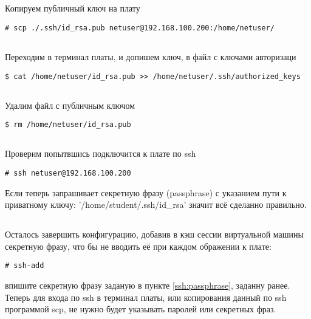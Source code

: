 \subsection{}Копируем публичный ключ на плату
\begin{lstlisting}[style=bash]
# scp ./.ssh/id_rsa.pub netuser@192.168.100.200:/home/netuser/
\end{lstlisting}

\subsection{}Переходим в терминал платы, и допишем ключ, в файл с ключами авторизаци
\begin{lstlisting}[style=bash]
$ cat /home/netuser/id_rsa.pub >> /home/netuser/.ssh/authorized_keys
\end{lstlisting}

\subsection{}Удалим файл с публичным ключом
\begin{lstlisting}[style=bash]
$ rm /home/netuser/id_rsa.pub
\end{lstlisting}

\subsection{}Проверим попытвшись подключится к плате по ssh
\begin{lstlisting}[style=bash]
# ssh netuser@192.168.100.200
\end{lstlisting}
Если теперь запрашивает секретную фразу (passphrase) с указанием пути к приватному ключу: '/home/student/.ssh/id\_rsa' значит всё сделанно правильно.

\subsection{}Осталось завершить конфигурацию, добавив в кэш сессии виртуальной машины секретную фразу, что бы не вводить её при каждом ображении к плате:
\begin{lstlisting}[style=bash]
# ssh-add
\end{lstlisting}
впишите секретную фразу заданую в пункте \ref{ssh:passphrase}, заданну ранее. Теперь для входа по ssh в терминал платы, или копирования данный по ssh программой scp, не нужно будет указывать паролей или секретных фраз.  

